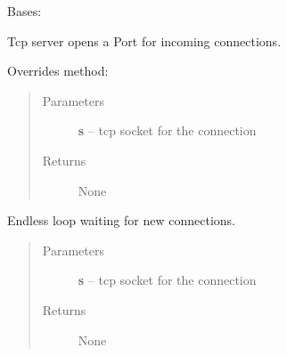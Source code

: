 \documentclass[letterpaper,10pt,english]{sphinxmanual}
\begin{document}
\begin{fulllineitems}
\label{libraries:libraries.ethernet.Server}
Bases: {\hyperref[libraries:libraries.ethernet._TcpConnection]{}}

Tcp server opens a Port for incoming connections.

\begin{fulllineitems}
\label{libraries:libraries.ethernet.Server._connection}
Overrides method: {\hyperref[libraries:libraries.ethernet._TcpConnection._connection]{}}
\begin{quote}\begin{description}
\item[{Parameters}] \leavevmode
\textbf{s} -- tcp socket for the connection

\item[{Returns}] \leavevmode
None

\end{description}\end{quote}

\end{fulllineitems}


\begin{fulllineitems}
\label{libraries:libraries.ethernet.Server.wait_connections}
Endless loop waiting for new connections.
\begin{quote}\begin{description}
\item[{Parameters}] \leavevmode
\textbf{s} -- tcp socket for the connection

\item[{Returns}] \leavevmode
None

\end{description}\end{quote}

\end{fulllineitems}


\end{fulllineitems}

\end{document}

